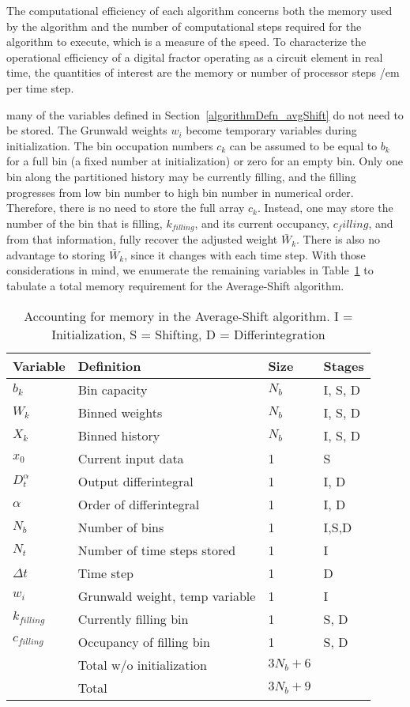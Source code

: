 
The computational efficiency of each algorithm concerns both the memory used by the algorithm and the number of computational steps required for the algorithm to execute, which is a measure of the speed. To characterize the operational efficiency of a digital fractor operating as a circuit element in real time, the quantities of interest are the memory or number of processor steps {/em per time step}.  

many of the variables defined in Section~\ref{algorithmDefn_avgShift} do not need to be stored. The Grunwald weights $w_i$ become temporary variables during initialization. The bin occupation numbers $c_k$ can be assumed to be equal to $b_k$ for a full bin (a fixed number at initialization) or zero for an empty bin. Only one bin along the partitioned history may be currently filling, and the filling progresses from low bin number to high bin number in numerical order. Therefore, there is no need to store the full array $c_k$. Instead, one may store the number of the bin that is filling, $k_{filling}$, and its current occupancy, $c_filling$, and from that information, fully recover the adjusted weight $\bar{W}_k$. There is also no advantage to storing $\bar{W}_k$, since it changes with each time step. With those considerations in mind, we enumerate the remaining variables in Table~\ref{tab:memory} to tabulate a total memory requirement for the Average-Shift algorithm.


\begin{table}[h]
\begin{tabular}{llll}
\hline
Variable& Definition & Size& Stages \\
\hline
$b_k$ & Bin capacity & $N_b$ &I, S, D \\
$W_k$ & Binned weights & $N_b$ &I, S, D \\
$X_k$ & Binned history & $N_b$ &I, S, D \\
$x_0$ & Current input data & 1 & S \\
$D_t^\alpha$ & Output differintegral & 1 & I, D\\
$\alpha$ &Order of differintegral &1 &I, D\\
$N_b$ &Number of bins &1 &I,S,D\\
$N_t$ &Number of time steps stored &1 & I\\
$\Delta t$ &Time step &1 &D\\
$w_i$ & Grunwald weight, temp variable & 1 & I\\
$k_{filling}$ & Currently filling bin & 1 & S, D\\
$c_{filling}$ & Occupancy of filling bin & 1 & S, D \\  
\hline
\hline
& Total w/o initialization &$3N_b+6$ &\\
 & Total & $3N_b+9$ &\\
\hline
\end{tabular}
\label{tab:memory}
\caption{Accounting for memory in the Average-Shift algorithm. I = Initialization, S = Shifting, D = Differintegration}
\end{table}

